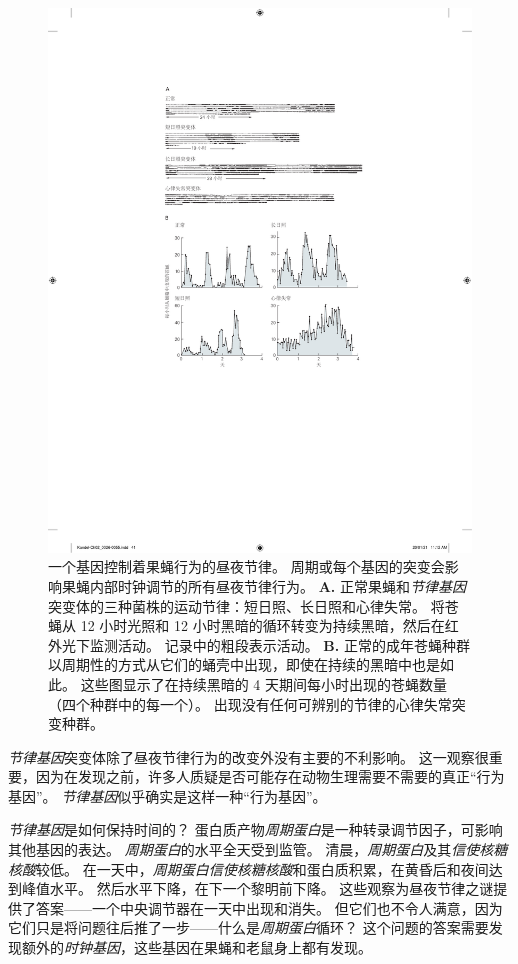 \begin{figure}[htbp]
	\centering
	\includegraphics[width=0.8\linewidth]{chap02/fig_2_11}
	\caption{一个基因控制着果蝇行为的昼夜节律。
		周期或每个基因的突变会影响果蝇内部时钟调节的所有昼夜节律行为\cite{konopka1971clock}。
		\textbf{A.} 正常果蝇和\textit{节律基因}突变体的三种菌株的运动节律：短日照、长日照和心律失常。
		将苍蝇从 12 小时光照和 12 小时黑暗的循环转变为持续黑暗，然后在红外光下监测活动。
		记录中的粗段表示活动。
		\textbf{B.} 正常的成年苍蝇种群以周期性的方式从它们的蛹壳中出现，即使在持续的黑暗中也是如此。
		这些图显示了在持续黑暗的 4 天期间每小时出现的苍蝇数量（四个种群中的每一个）。
		出现没有任何可辨别的节律的心律失常突变种群。}
	\label{fig:2_11}
\end{figure}


\textit{节律基因}突变体除了昼夜节律行为的改变外没有主要的不利影响。
这一观察很重要，因为在发现之前，许多人质疑是否可能存在动物生理需要不需要的真正“行为基因”。
\textit{节律基因}似乎确实是这样一种“行为基因”。


\textit{节律基因}是如何保持时间的？
蛋白质产物\textit{周期蛋白}是一种转录调节因子，可影响其他基因的表达。
\textit{周期蛋白}的水平全天受到监管。
清晨，\textit{周期蛋白}及其\textit{信使核糖核酸}较低。
在一天中，\textit{周期蛋白}\textit{信使核糖核酸}和蛋白质积累，在黄昏后和夜间达到峰值水平。
然后水平下降，在下一个黎明前下降。
这些观察为昼夜节律之谜提供了答案——一个中央调节器在一天中出现和消失。
但它们也不令人满意，因为它们只是将问题往后推了一步——什么是\textit{周期蛋白}循环？
这个问题的答案需要发现额外的\textit{时钟基因}，这些基因在果蝇和老鼠身上都有发现。


